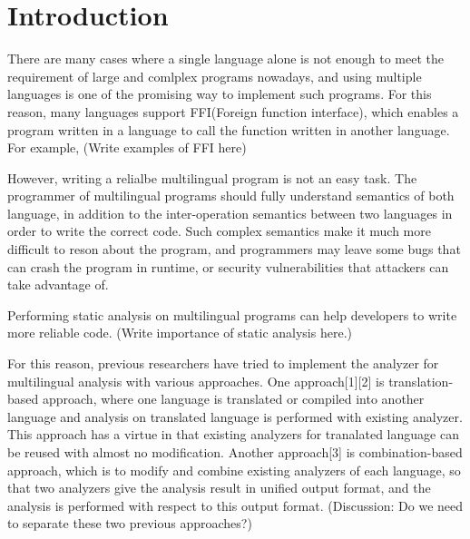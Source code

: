 \section{Introduction}

There are many cases where a single language alone is not enough to meet the
requirement of large and comlplex programs nowadays, and using multiple
languages is one of the promising way to implement such programs. For this
reason, many languages support FFI(Foreign function interface), which enables a
program written in a language to call the function written in another language.
For example, (Write examples of FFI here)

However, writing a relialbe multilingual program is not an easy task. The
programmer of multilingual programs should fully understand semantics of both
language, in addition to the inter-operation semantics between two languages in
order to write the correct code.  Such complex semantics make it much more
difficult to reson about the program, and programmers may leave some bugs that
can crash the program in runtime, or security vulnerabilities that attackers
can take advantage of.

Performing static analysis on multilingual programs can help developers to
write more reliable code. (Write importance of static analysis here.)

For this reason, previous researchers have tried to implement the analyzer for
multilingual analysis with various approaches.  One approach[1][2] is
translation-based approach, where one language is translated or compiled into
another language and analysis on translated language is performed with existing
analyzer. This approach has a virtue in that existing analyzers for tranalated
language can be reused with almost no modification.  Another approach[3] is
combination-based approach, which is to modify and combine existing analyzers
of each language, so that two analyzers give the analysis result in unified
output format, and the analysis is performed with respect to this output
format.
(Discussion: Do we need to separate these two previous approaches?)

